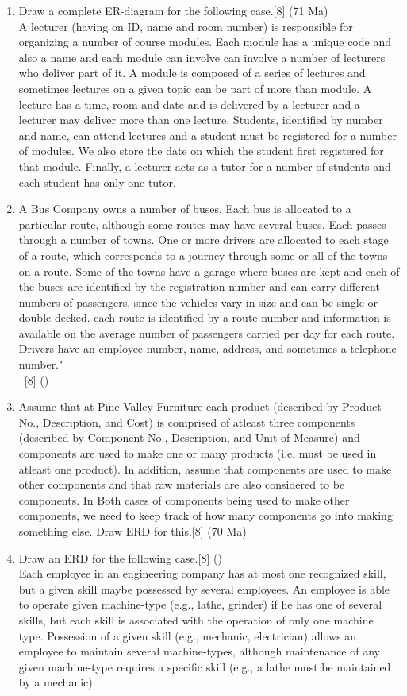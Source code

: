 \documentclass[12pt]{article}
\newcommand{\enter}{\\\textcolor{white}{1}}
\begin{document}
\begin{enumerate}
    \item  Draw a complete ER-diagram for the following case.\hfill[8] (71 Ma)\\
    A lecturer (having on ID, name and room number) is responsible for organizing a number of course modules. Each module has a unique code and also a name and each module can involve can involve a number of lecturers who deliver part of it. A module is composed of a series of lectures and sometimes lectures on a given topic can be part of more than module. A lecture has a time, room and date and is delivered by a lecturer and a lecturer may deliver more than one lecture. Students, identified by number and name, can attend lectures and a student must be registered for a number of modules. We also store the date on which the student first registered for that module. Finally, a lecturer acts as a tutor for a number of students and each student has only one tutor.

    \item A Bus Company owns a number of buses. Each bus is allocated to a particular route, although some routes may have several buses. Each passes through a number of towns. One or more drivers are allocated to each stage of a route, which corresponds to a journey through some or all of the towns on a route. Some of the towns have a garage where buses are kept and each of the buses are identified by the registration number and can carry different numbers of passengers, since the vehicles vary in size and can be single or double decked. each route is identified by a route number and information is available on the average number of passengers carried per day for each route. Drivers have an employee number, name, address, and sometimes a telephone number."
    \enter\hfill[8] ()

    \item Assume that at Pine Valley Furniture each product (described by Product No., Description, and Cost) is comprised of atleast three components (described by Component No., Description, and Unit of Measure) and components are used to make one or many products (i.e. must be used in atleast one product). In addition, assume that components are used to make other components and that raw materials are also considered to be components. In Both cases of components being used to make other components, we need to keep track of how many components go into making something else. Draw ERD for this.\hfill[8] (70 Ma)

    \item Draw an ERD for the following case.\hfill[8] ()\\
    Each employee in an engineering company has at most one recognized skill, but a given skill maybe possessed by several employees. An employee is able to operate given machine-type (e.g., lathe, grinder) if he has one of several skills, but each skill is associated with the operation of only one machine type. Possession of a given skill (e.g., mechanic, electrician) allows an employee to maintain several machine-types, although maintenance of any given machine-type requires a specific skill (e.g., a lathe must be maintained by a mechanic).


\end{enumerate}
\end{document}
